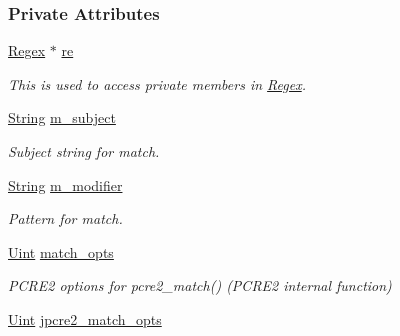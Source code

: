 \subsubsection*{Private Attributes}
\begin{DoxyCompactItemize}
\item 
\hyperlink{classjpcre2_1_1Regex}{Regex} $\ast$ \hyperlink{classjpcre2_1_1RegexMatch_a7743b27db00c1e13d8fee51b70d5a133}{re}\hypertarget{classjpcre2_1_1RegexMatch_a7743b27db00c1e13d8fee51b70d5a133}{}\label{classjpcre2_1_1RegexMatch_a7743b27db00c1e13d8fee51b70d5a133}

\begin{DoxyCompactList}\small\item\em This is used to access private members in \hyperlink{classjpcre2_1_1Regex}{Regex}. \end{DoxyCompactList}\item 
\hyperlink{namespacejpcre2_a91f03070152fb228bc116c5a737f1d16}{String} \hyperlink{classjpcre2_1_1RegexMatch_a9df4f1897e7fa33e05a9f6f938992ca7}{m\+\_\+subject}\hypertarget{classjpcre2_1_1RegexMatch_a9df4f1897e7fa33e05a9f6f938992ca7}{}\label{classjpcre2_1_1RegexMatch_a9df4f1897e7fa33e05a9f6f938992ca7}

\begin{DoxyCompactList}\small\item\em Subject string for match. \end{DoxyCompactList}\item 
\hyperlink{namespacejpcre2_a91f03070152fb228bc116c5a737f1d16}{String} \hyperlink{classjpcre2_1_1RegexMatch_a5d3e216a4cfc80d00fc45c51a8136821}{m\+\_\+modifier}\hypertarget{classjpcre2_1_1RegexMatch_a5d3e216a4cfc80d00fc45c51a8136821}{}\label{classjpcre2_1_1RegexMatch_a5d3e216a4cfc80d00fc45c51a8136821}

\begin{DoxyCompactList}\small\item\em Pattern for match. \end{DoxyCompactList}\item 
\hyperlink{namespacejpcre2_a078242d38221a13fb3543b9edd78c099}{Uint} \hyperlink{classjpcre2_1_1RegexMatch_a697d5731007350b0f20d2018fcfafa90}{match\+\_\+opts}\hypertarget{classjpcre2_1_1RegexMatch_a697d5731007350b0f20d2018fcfafa90}{}\label{classjpcre2_1_1RegexMatch_a697d5731007350b0f20d2018fcfafa90}

\begin{DoxyCompactList}\small\item\em P\+C\+R\+E2 options for pcre2\+\_\+match() (P\+C\+R\+E2 internal function) \end{DoxyCompactList}\item 
\hyperlink{namespacejpcre2_a078242d38221a13fb3543b9edd78c099}{Uint} \hyperlink{classjpcre2_1_1RegexMatch_a70d62df887eeed237724f64fbc378700}{jpcre2\+\_\+match\+\_\+opts}\hypertarget{classjpcre2_1_1RegexMatch_a70d62df887eeed237724f64fbc378700}{}\label{classjpcre2_1_1RegexMatch_a70d62df887eeed237724f64fbc378700}


\end{DoxyCompactItemize}
